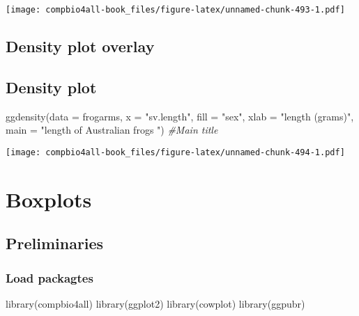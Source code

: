 \documentclass[
]{book}
\newenvironment{Shaded}{\begin{snugshade}}{\end{snugshade}}
\newcommand{\AttributeTok}[1]{\textcolor[rgb]{0.77,0.63,0.00}{#1}}
\newcommand{\CommentTok}[1]{\textcolor[rgb]{0.56,0.35,0.01}{\textit{#1}}}
\newcommand{\FunctionTok}[1]{\textcolor[rgb]{0.00,0.00,0.00}{#1}}
\newcommand{\NormalTok}[1]{#1}
\newcommand{\StringTok}[1]{\textcolor[rgb]{0.31,0.60,0.02}{#1}}
\begin{document}
\texttt{[image: compbio4all-book\_files/figure-latex/unnamed-chunk-493-1.pdf]}

\hypertarget{density-plot-overlay}{%
\section{Density plot overlay}\label{density-plot-overlay}}

\hypertarget{density-plot-1}{%
\section{Density plot}\label{density-plot-1}}

\begin{Shaded}
\begin{Highlighting}[]
\FunctionTok{ggdensity}\NormalTok{(}\AttributeTok{data =}\NormalTok{ frogarms,}
            \AttributeTok{x =} \StringTok{"sv.length"}\NormalTok{,}
            \AttributeTok{fill =} \StringTok{"sex"}\NormalTok{,}
            \AttributeTok{xlab =} \StringTok{"length (grams)"}\NormalTok{,}
          \AttributeTok{main =} \StringTok{"length of Australian frogs "}\NormalTok{) }\CommentTok{\#Main title}
\end{Highlighting}
\end{Shaded}

\texttt{[image: compbio4all-book\_files/figure-latex/unnamed-chunk-494-1.pdf]}

\hypertarget{boxplots-3}{%
\chapter{Boxplots}\label{boxplots-3}}

\hypertarget{preliminaries-11}{%
\section{Preliminaries}\label{preliminaries-11}}

\hypertarget{load-packagtes-2}{%
\subsection{Load packagtes}\label{load-packagtes-2}}

\begin{Shaded}
\begin{Highlighting}[]
\FunctionTok{library}\NormalTok{(compbio4all)}
\FunctionTok{library}\NormalTok{(ggplot2)}
\FunctionTok{library}\NormalTok{(cowplot)}
\FunctionTok{library}\NormalTok{(ggpubr)}
\end{Highlighting}
\end{Shaded}
\end{document}
